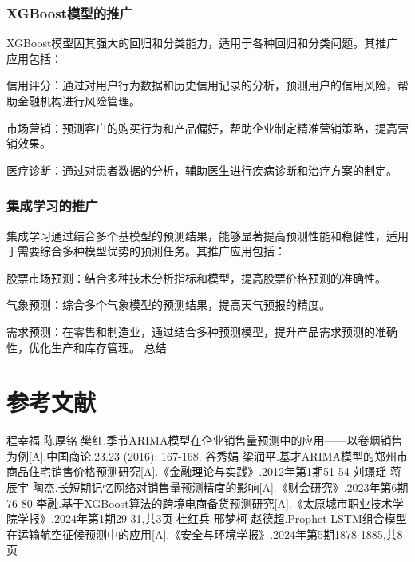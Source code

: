 \documentclass[a4paper]{article}
\begin{document}
	\subsubsection{XGBoost模型的推广}
	XGBoost模型因其强大的回归和分类能力，适用于各种回归和分类问题。其推广应用包括：

	信用评分：通过对用户行为数据和历史信用记录的分析，预测用户的信用风险，帮助金融机构进行风险管理。
	
	市场营销：预测客户的购买行为和产品偏好，帮助企业制定精准营销策略，提高营销效果。
	
	医疗诊断：通过对患者数据的分析，辅助医生进行疾病诊断和治疗方案的制定。
	\subsubsection{集成学习的推广}
	集成学习通过结合多个基模型的预测结果，能够显著提高预测性能和稳健性，适用于需要综合多种模型优势的预测任务。其推广应用包括：

	股票市场预测：结合多种技术分析指标和模型，提高股票价格预测的准确性。
	
	气象预测：综合多个气象模型的预测结果，提高天气预报的精度。
	
	需求预测：在零售和制造业，通过结合多种预测模型，提升产品需求预测的准确性，优化生产和库存管理。
	总结
	\newpage
	\pagestyle{plain}
	\section{参考文献}
	\begin{thebibliography}{9}
		程幸福 \hspace{2pt}陈厚铭 \hspace{2pt}樊红.季节ARIMA模型在企业销售量预测中的应用——以卷烟销售为例[A].中国商论.23.23 (2016): 167-168.
		谷秀娟 \hspace{2pt}梁润平.基才ARIMA模型的郑州市商品住宅销售价格预测研究[A].《金融理论与实践》.2012年第1期51-54
		刘璟瑶 \hspace{2pt}蒋辰宇 \hspace{2pt}陶杰.长短期记忆网络对销售量预测精度的影响[A].《财会研究》.2023年第6期76-80
		李融.基于XGBoost算法的跨境电商备货预测研究[A].《太原城市职业技术学院学报》.2024年第1期29-31,共3页
		杜红兵 \hspace{2pt}邢梦柯 \hspace{2pt}赵德超.Prophet-LSTM组合模型在运输航空征候预测中的应用[A].《安全与环境学报》.2024年第5期1878-1885,共8页
	\end{thebibliography}
	\newpage %
\end{document}
